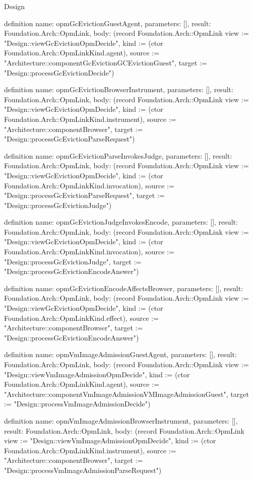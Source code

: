 \begin{lexlean}{Design}
\begin{semanticmodule}
definition{
  name: opmGcEvictionGuestAgent,
  parameters: [],
  result: Foundation.Arch::OpmLink,
  body: (record Foundation.Arch::OpmLink {view := "Design::viewGcEvictionOpmDecide", kind := (ctor Foundation.Arch::OpmLinkKind.agent), source := "Architecture::componentGcEvictionGCEvictionGuest", target := "Design::processGcEvictionDecide"})
}

definition{
  name: opmGcEvictionBrowserInstrument,
  parameters: [],
  result: Foundation.Arch::OpmLink,
  body: (record Foundation.Arch::OpmLink {view := "Design::viewGcEvictionOpmDecide", kind := (ctor Foundation.Arch::OpmLinkKind.instrument), source := "Architecture::componentBrowser", target := "Design::processGcEvictionParseRequest"})
}

definition{
  name: opmGcEvictionParseInvokesJudge,
  parameters: [],
  result: Foundation.Arch::OpmLink,
  body: (record Foundation.Arch::OpmLink {view := "Design::viewGcEvictionOpmDecide", kind := (ctor Foundation.Arch::OpmLinkKind.invocation), source := "Design::processGcEvictionParseRequest", target := "Design::processGcEvictionJudge"})
}

definition{
  name: opmGcEvictionJudgeInvokesEncode,
  parameters: [],
  result: Foundation.Arch::OpmLink,
  body: (record Foundation.Arch::OpmLink {view := "Design::viewGcEvictionOpmDecide", kind := (ctor Foundation.Arch::OpmLinkKind.invocation), source := "Design::processGcEvictionJudge", target := "Design::processGcEvictionEncodeAnswer"})
}

definition{
  name: opmGcEvictionEncodeAffectsBrowser,
  parameters: [],
  result: Foundation.Arch::OpmLink,
  body: (record Foundation.Arch::OpmLink {view := "Design::viewGcEvictionOpmDecide", kind := (ctor Foundation.Arch::OpmLinkKind.effect), source := "Architecture::componentBrowser", target := "Design::processGcEvictionEncodeAnswer"})
}

definition{
  name: opmVmImageAdmissionGuestAgent,
  parameters: [],
  result: Foundation.Arch::OpmLink,
  body: (record Foundation.Arch::OpmLink {view := "Design::viewVmImageAdmissionOpmDecide", kind := (ctor Foundation.Arch::OpmLinkKind.agent), source := "Architecture::componentVmImageAdmissionVMImageAdmissionGuest", target := "Design::processVmImageAdmissionDecide"})
}

definition{
  name: opmVmImageAdmissionBrowserInstrument,
  parameters: [],
  result: Foundation.Arch::OpmLink,
  body: (record Foundation.Arch::OpmLink {view := "Design::viewVmImageAdmissionOpmDecide", kind := (ctor Foundation.Arch::OpmLinkKind.instrument), source := "Architecture::componentBrowser", target := "Design::processVmImageAdmissionParseRequest"})
}


\end{semanticmodule}
\end{lexlean}
